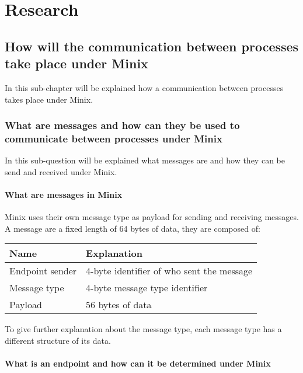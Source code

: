 \hypertarget{research}{%
\section{Research}\label{research}}

\hypertarget{how-will-the-communication-between-processes-take-place-under-minix}{%
\subsection{How will the communication between processes take place
under
Minix}\label{how-will-the-communication-between-processes-take-place-under-minix}}

In this sub-chapter will be explained how a communication between
processes takes place under Minix.

\hypertarget{what-are-messages-and-how-can-they-be-used-to-communicate-between-processes-under-minix}{%
\subsubsection{What are messages and how can they be used to communicate
between processes under
Minix}\label{what-are-messages-and-how-can-they-be-used-to-communicate-between-processes-under-minix}}

In this sub-question will be explained what messages are and how they
can be send and received under Minix.

\hypertarget{what-are-messages-in-minix}{%
\paragraph{What are messages in
Minix}\label{what-are-messages-in-minix}}

Minix uses their own message type as payload for sending and receiving
messages. A message are a fixed length of 64 bytes of data, they are
composed of:

\begin{longtable}[]{@{}ll@{}}
\toprule
Name & Explanation\tabularnewline
\midrule
\endhead
Endpoint sender & 4-byte identifier of who sent the
message\tabularnewline
Message type & 4-byte message type identifier\tabularnewline
Payload & 56 bytes of data\tabularnewline
\bottomrule
\end{longtable}

To give further explanation about the message type, each message type
has a different structure of its data.

\hypertarget{what-is-an-endpoint-and-how-can-it-be-determined-under-minix}{%
\paragraph{What is an endpoint and how can it be determined under
Minix}\label{what-is-an-endpoint-and-how-can-it-be-determined-under-minix}}

